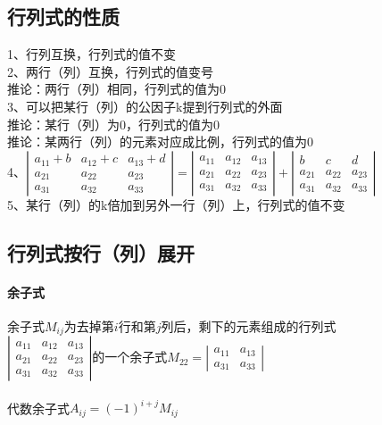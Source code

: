 \documentclass{article}
\begin{document}
\begin{flushleft}
	\subsection{行列式的性质}
	1、行列互换，行列式的值不变\\
	2、两行（列）互换，行列式的值变号\\
	\qquad 推论：两行（列）相同，行列式的值为0\\
	3、可以把某行（列）的公因子k提到行列式的外面\\
	\qquad 推论：某行（列）为0，行列式的值为0\\
	\qquad 推论：某两行（列）的元素对应成比例，行列式的值为0\\
	4、$\left|\begin{array}{cccc} 
	a_{11}+b&a_{12}+c&a_{13}+d\\ 
	a_{21}&a_{22}&a_{23}\\
	a_{31}&a_{32}&a_{33}
	\end{array}\right|=\left|\begin{array}{cccc} 
	a_{11}&a_{12}&a_{13}\\ 
	a_{21}&a_{22}&a_{23}\\
	a_{31}&a_{32}&a_{33}
	\end{array}\right|+\left|\begin{array}{cccc} 
	b&c&d\\ 
	a_{21}&a_{22}&a_{23}\\
	a_{31}&a_{32}&a_{33}
	\end{array}\right|$\\
	5、某行（列）的k倍加到另外一行（列）上，行列式的值不变\\
	
	\subsection{行列式按行（列）展开}
	
	\paragraph{余子式}
	余子式$M_{ij}$为去掉第$i$行和第$j$列后，剩下的元素组成的行列式\\
	$\left|\begin{array}{cccc} 
	a_{11}&a_{12}&a_{13}\\ 
	a_{21}&a_{22}&a_{23}\\
	a_{31}&a_{32}&a_{33}
	\end{array}\right|$的一个余子式$M_{22}=\left|\begin{array}{cccc} 
	a_{11}&a_{13}\\
	a_{31}&a_{33}
	\end{array}\right|$\\
	~\\
	代数余子式$A_{ij}=(-1)^{i+j}M_{ij}$\\
	
		

\end{flushleft}
\end{document}
